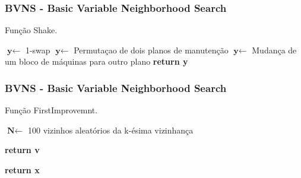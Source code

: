 \documentclass{beamer}
\begin{document}
    \begin{frame}
        \frametitle{BVNS - Basic Variable Neighborhood Search}
        \begin{algorithm}[H]
            \caption{Função Shake.}\label{alg:shake}
            \begin{algorithmic}[1]
                    \State $\textbf{y} \gets$ 1-swap
                \EndIf
                    \State $\textbf{y} \gets$ Permutaçao de dois planos de manutenção
                \EndIf
                    \State $\textbf{y} \gets$ Mudança de um bloco de máquinas para outro plano
                \EndIf
            \Statex
            \State \textbf{return y} 

            \EndProcedure 
            \end{algorithmic}
        \end{algorithm}
    \end{frame}

    \begin{frame}
        \frametitle{BVNS - Basic Variable Neighborhood Search}
        \begin{algorithm}[H]
            \caption{Função FirstImprovemnt.}\label{alg:first-improvement}

            \begin{algorithmic}[1]

            \State $\textbf{N} \gets$ 100 vizinhos aleatórios da k-ésima vizinhança


                    \State \textbf{return v} 
                \EndIf
            \EndFor
               
            \Statex
            \State \textbf{return x} 
            \EndProcedure 
            \end{algorithmic}
        \end{algorithm}
    \end{frame}
\end{document}
